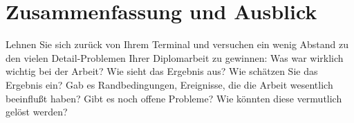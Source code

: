 \chapter{Zusammenfassung und Ausblick}
Lehnen Sie sich zurück von Ihrem Terminal und versuchen ein wenig Abstand zu den vielen Detail-Problemen Ihrer Diplomarbeit zu gewinnen:
Was war wirklich wichtig bei der Arbeit? 
Wie sieht das Ergebnis aus?
Wie schätzen Sie das Ergebnis ein?
Gab es Randbedingungen, Ereignisse, die die Arbeit wesentlich beeinflußt haben?
Gibt es noch offene Probleme?
Wie könnten diese vermutlich gelöst werden?